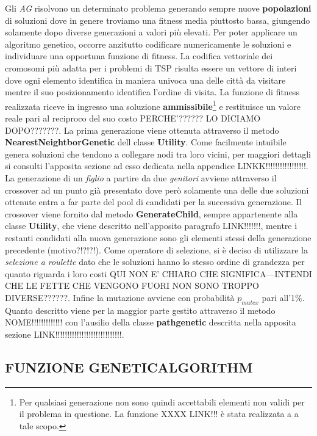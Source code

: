 \documentclass[11pt]{article}
\begin{document}
Gli \textit{AG} risolvono un determinato problema generando sempre nuove \textbf{popolazioni} di soluzioni dove in genere troviamo una fitness media piuttosto bassa, giungendo solamente dopo diverse generazioni a valori più elevati. Per poter applicare un algoritmo genetico, occorre anzitutto codificare numericamente le soluzioni e individuare una opportuna funzione di fitness. La codifica vettoriale dei cromosomi più adatta per i problemi di TSP risulta essere un vettore di interi dove ogni elemento identifica in maniera univoca una delle città da visitare mentre il suo posizionamento identifica l'ordine di visita.
La funzione di fitness realizzata riceve in ingresso una soluzione \textbf{ammissibile}\footnote{Per qualsiasi generazione non sono quindi accettabili elementi non validi per il problema in questione. La funzione XXXX LINK!!! è stata realizzata a a tale scopo.} e restituisce un valore reale pari al reciproco del suo costo PERCHE'?????? LO DICIAMO DOPO???????.
La prima generazione viene ottenuta attraverso il metodo \textbf{NearestNeightborGenetic} dell classe \textbf{Utility}. Come facilmente intuibile genera soluzioni che tendono a collegare nodi tra loro vicini, per maggiori dettagli si consulti l'apposita sezione ad esso dedicata nella appendice LINKK!!!!!!!!!!!!!!!!!.
La generazione di un \textit{figlio} a partire da due \textit{genitori} avviene attraverso il crossover ad un punto già presentato dove però solamente una delle due soluzioni ottenute entra a far parte del pool di candidati per la successiva generazione. Il crossover viene fornito dal metodo \textbf{GenerateChild}, sempre appartenente alla classe \textbf{Utility}, che viene descritto nell'apposito paragrafo LINK!!!!!!!, mentre i restanti condidati alla nuova generazione sono gli elementi stessi della generazione precedente (motivo?!?!?!).
Come operatore di selezione, si è deciso di utilizzare la \textit{selezione a roulette} dato che le soluzioni hanno lo stesso ordine di grandezza per quanto riguarda i loro costi QUI NON E' CHIARO CHE SIGNIFICA---INTENDI CHE LE FETTE CHE VENGONO FUORI NON SONO TROPPO DIVERSE??????. Infine la mutazione avviene con probabilità $p_{mutex}$ pari all'1\%.
Quanto descritto viene per la maggior parte gestito attraverso il metodo NOME!!!!!!!!!!!!! con l'ausilio della classe \textbf{pathgenetic} descritta nella apposita sezione LINK!!!!!!!!!!!!!!!!!!!!!!!!!!!!.

\subsection*{FUNZIONE GENETICALGORITHM}
\end{document}
